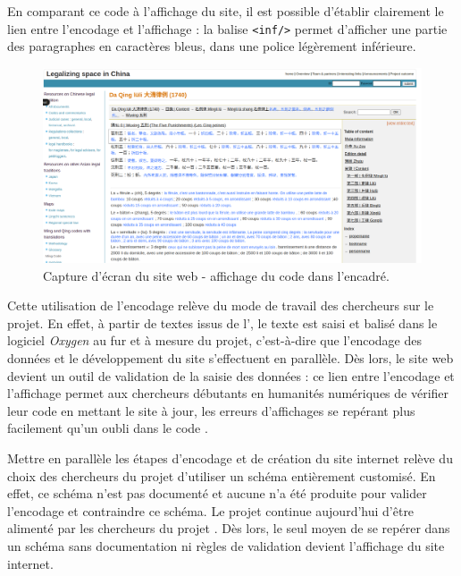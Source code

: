 En comparant ce code \XML à l'affichage du site, il est possible d'établir clairement le lien entre l'encodage et l'affichage : la balise \texttt{<inf/>} permet d'afficher une partie des paragraphes en caractères bleus, dans une police légèrement inférieure. 
\begin{figure}[h]
    \centering
    \includegraphics[width=\textwidth]{images/image1.png}
    \caption{Capture d'écran du site web \LSC - affichage du code \XML dans l'encadré.}
\end{figure}

Cette utilisation de l'encodage relève du mode de travail des chercheurs sur le projet. En effet, à partir de textes issus de l'\OCR, le texte est saisi et balisé dans le logiciel \textit{Oxygen} au fur et à mesure du projet, c'est-à-dire que l'encodage des données et le développement du site s'effectuent en parallèle. Dès lors, le site web devient un outil de validation de la saisie des données : ce lien entre l'encodage et l'affichage permet aux chercheurs débutants en humanités numériques de vérifier leur code en mettant le site à jour, les erreurs d'affichages se repérant plus facilement qu'un oubli dans le code \XML. 

Mettre en parallèle les étapes d'encodage et de création du site internet relève du choix des chercheurs du projet d'utiliser un schéma \XML entièrement customisé. En effet, ce schéma n'est pas documenté et aucune \DTD n'a été produite pour valider l'encodage et contraindre ce schéma. Le projet \LSC continue aujourd'hui d'être alimenté par les chercheurs du projet \COREL. Dès lors, le seul moyen de se repérer dans un schéma sans documentation ni règles de validation devient l'affichage du site internet.

